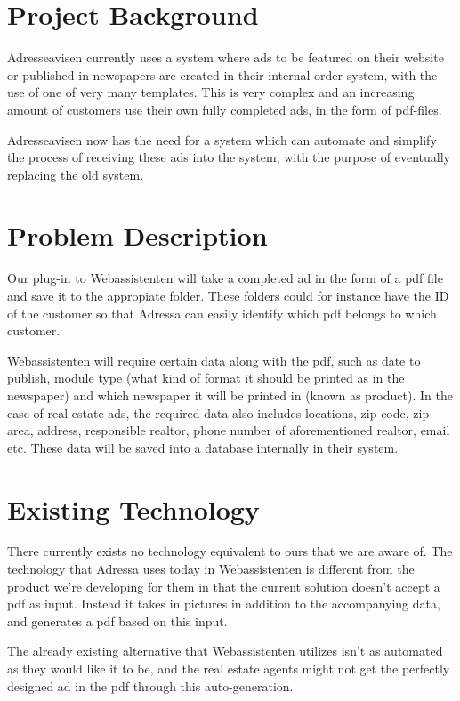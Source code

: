 \section{Project Background}
Adresseavisen currently uses a system where ads to be featured on their website or published in newspapers are created in their internal order system, with the use of one of very many templates. This is very complex and an increasing amount of customers use their own fully completed ads, in the form of pdf-files.

Adresseavisen now has the need for a system which can automate and simplify the process of receiving these ads into the system, with the purpose of eventually replacing the old system.

\section{Problem Description}
Our plug-in to Webassistenten will take a completed ad in the form of a pdf file and save it to the appropiate folder. These folders could for instance have the ID of the customer so that Adressa can easily identify which pdf belongs to which customer.

Webassistenten will require certain data along with the pdf, such as date to publish, module type (what kind of format it should be printed as in the newspaper) and which newspaper it will be printed in (known as product). In the case of real estate ads, the required data also includes locations, zip code, zip area, address, responsible realtor, phone number of aforementioned realtor, email etc. These data will be saved into a database internally in their system. 

\section{Existing Technology}
There currently exists no technology equivalent to ours that we are aware of. The technology that Adressa uses today in Webassistenten is different from the product we're developing for them in that the current solution doesn't accept a pdf as input. Instead it takes in pictures in addition to the accompanying data, and generates a pdf based on this input.

The already existing alternative that Webassistenten utilizes isn't as automated as they would like it to be, and the real estate agents might not get the perfectly designed ad in the pdf through this auto-generation.

